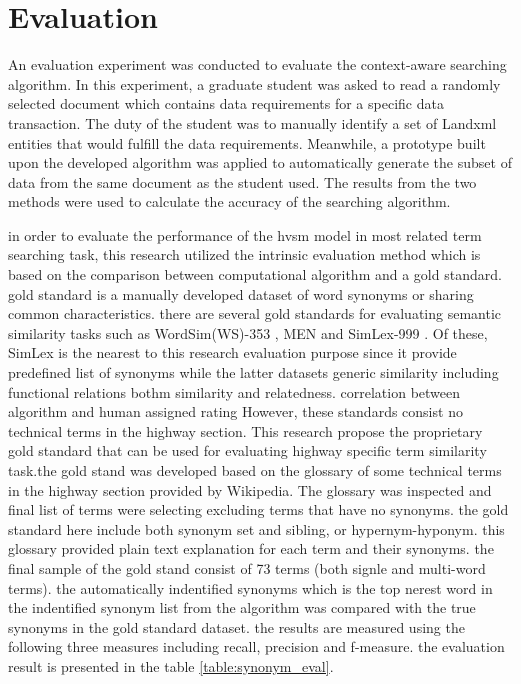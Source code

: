 \documentclass[Journal, InsideFigs, DoubleSpace]{ascelike} %
\begin{document}
\section{Evaluation} \label{sec:val}
An evaluation experiment was conducted to evaluate the context-aware searching algorithm. In this experiment, a graduate student was asked to read a randomly selected document which contains data requirements for a specific data transaction. The duty of the student was to manually identify a set of Landxml entities that would fulfill the data requirements. Meanwhile, a prototype built upon the developed algorithm was applied to automatically generate the subset of data from the same document as the student used. The results from the two methods were used to calculate the accuracy of the searching algorithm.

in order to evaluate the performance of the hvsm model in most related term searching task, this research utilized the intrinsic evaluation method which is based on the comparison between computational algorithm and a gold standard. gold standard is a manually developed dataset of word synonyms or sharing common characteristics. there are several gold standards for evaluating semantic similarity tasks such as WordSim(WS)-353 \cite{finkelstein01}, MEN \cite{bruni12} and SimLex-999 \cite{hill14}. Of these, SimLex is the nearest to this research evaluation purpose since it provide predefined list of synonyms while the latter datasets generic similarity including functional relations bothm similarity and relatedness. correlation between algorithm and human assigned rating However, these standards consist no technical terms in the highway section. This research propose the proprietary gold standard that can be used for evaluating highway specific term similarity task.the gold stand was developed based on the glossary of some technical terms in the highway section provided by Wikipedia. The glossary was inspected and final list of terms were selecting excluding terms that have no synonyms. the gold standard here include both synonym set and sibling, or hypernym-hyponym. this glossary provided plain text explanation for each term and their synonyms. the final sample of the gold stand consist of 73 terms (both signle and multi-word terms).  the automatically indentified synonyms which is the top nerest word in the indentified synonym list from the algorithm was compared with the true synonyms in the gold standard dataset. the results are measured using the following three measures including recall, precision and f-measure. the evaluation result is presented in the table \ref{table:synonym_eval}.
\end{document}
